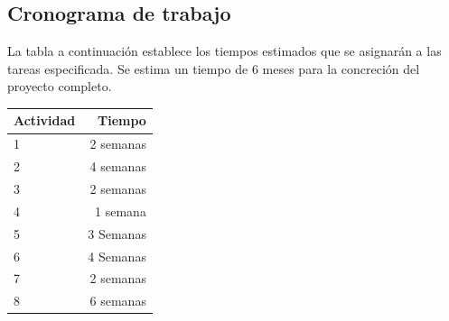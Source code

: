 \documentclass[12pt]{article}
\begin{document}
\subsection{Cronograma de trabajo}

La tabla a continuación establece los tiempos estimados que se asignarán a las tareas especificada.
Se estima un tiempo de 6 meses para la concreción del proyecto completo.


\begin{table}[H]
    \centering
    \begin{tabular}{|l|r|} \hline 
         Actividad& Tiempo\\ \hline 
         1& 2 semanas\\ \hline 
         2& 4 semanas\\ \hline 
         3& 2 semanas\\ \hline 
         4& 1 semana\\ \hline 
         5& 3 Semanas\\ \hline 
         6& 4 Semanas\\ \hline 
         7& 2 semanas\\ \hline 
         8& 6 semanas\\ \hline
    \end{tabular}
    \label{tab:my_label}
\end{table}

\end{document}
